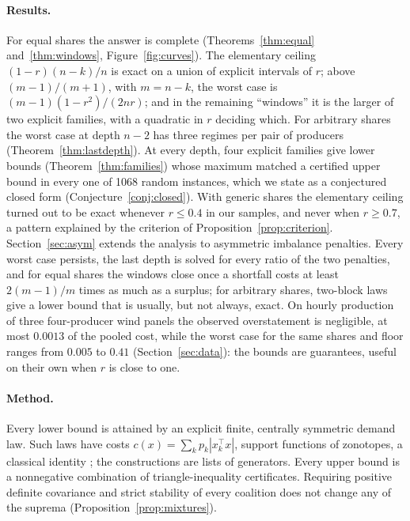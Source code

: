 \documentclass[11pt,a4paper]{article}
\theoremstyle{remark}
\begin{document}
\paragraph{Results.} For equal shares the answer is complete
(Theorems~\ref{thm:equal} and~\ref{thm:windows}, Figure~\ref{fig:curves}). The
elementary ceiling $(1-r)(n-k)/n$ is exact on a union of explicit intervals of
$r$; above $(m-1)/(m+1)$, with $m=n-k$, the worst case is
$(m-1)(1-r^2)/(2nr)$; and in the remaining ``windows'' it is the larger of two
explicit families, with a quadratic in $r$ deciding which. For arbitrary shares
the worst case at depth $n-2$ has three regimes per pair of producers
(Theorem~\ref{thm:lastdepth}). At every depth, four explicit families give
lower bounds (Theorem~\ref{thm:families}) whose maximum matched a certified
upper bound in every one of 1068 random instances, which we state as a
conjectured closed form (Conjecture~\ref{conj:closed}). With generic shares the
elementary ceiling turned out to be exact whenever $r\le 0.4$ in our samples,
and never when $r\ge 0.7$, a pattern explained by the criterion of
Proposition~\ref{prop:criterion}. Section~\ref{sec:asym} extends the analysis to
asymmetric imbalance penalties. Every worst case persists, the last depth is
solved for every ratio of the two penalties, and for equal shares the windows
close once a shortfall costs at least $2(m-1)/m$ times as much as a surplus;
for arbitrary shares, two-block laws give a lower bound that is usually,
but not always, exact. On hourly production of three four-producer wind panels the
observed overstatement is negligible, at most $0.0013$ of the pooled cost,
while the worst case for the same shares and floor ranges from $0.005$ to
$0.41$ (Section~\ref{sec:data}): the bounds are guarantees, useful on their
own when $r$ is close to one.

\paragraph{Method.} Every lower bound is attained by an explicit finite,
centrally symmetric demand law. Such laws have costs $c(x)=\sum_k p_k|x_k^\top
x|$, support functions of zonotopes, a classical identity
\citep{koshevoy1997zonoid, molchanov2012zonoid}; the constructions are lists of
generators. Every upper bound is a nonnegative combination of
triangle-inequality certificates. Requiring positive definite covariance and
strict stability of every coalition does not change any of the suprema
(Proposition~\ref{prop:mixtures}).
\end{document}
